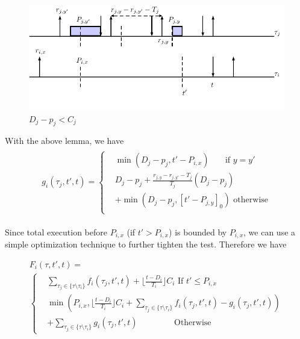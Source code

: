 \begin{figure}[h!]
 \centering
\includegraphics[scale=0.7]{fig/Cy}  
\caption{$D_j-p_j<C_j$}
  \label{fig:o2}
\end{figure}
With the above lemma, we have
	\begin{align*}
	\begin{split}
	g_{i}(\tau_j,t',t)=
	\begin{cases}
	&\min(D_j-p_j, t'-P_{i,x})~\mbox{~~~~~if~} y=y'\\
	&D_j-p_j+\frac{r_{j,y}-r_{j,y'}-T_j}{T_j}(D_j-p_j)\\&+\min(D_j-p_j, [t'-P_{j,y}]_0)\mbox{~otherwise} \\
	\end{cases}
	\end{split}
	\end{align*}

Since total execution before $P_{i,x}$ (if $t'>P_{i,x}$) is bounded by  $P_{i,x}$, we can use a simple optimization technique to further tighten the test. Therefore we have 

\begin{equation}
\begin{split}
F_i(\tau,t',t)=~~~~~~~~~~~~~~~~~~~~~~~~~~~~~~~~~~~~~~~~~~~~~~\\
\begin{cases}
& \sum\limits_{\tau_j\in\{\tau\setminus\tau_i\}}f_i(\tau_j,t',t)+ \lfloor \frac{t-D_i}{T_i} \rfloor C_i\mbox{~If~} t'\leq P_{i,x}\\
&\min\!\left(P_{i,x},  \lfloor \frac{t-D_i}{T_i} \rfloor C_i\!\!+\!\!\!\!\!\!\!\sum\limits_{\tau_j\in\{\tau\setminus\tau_i\}}\!\!\!\!\!\!f_i(\tau_j,t',t)\!-\!g_{i}(\tau_j,t',t)\!\right)\\&+\sum_{\tau_j\in\{\tau\setminus\tau_i\}}g_{i}(\tau_j,t',t)\mbox{~~~~~~~~~~~~~Otherwise}
\end{cases}	
\end{split}
\end{equation}






